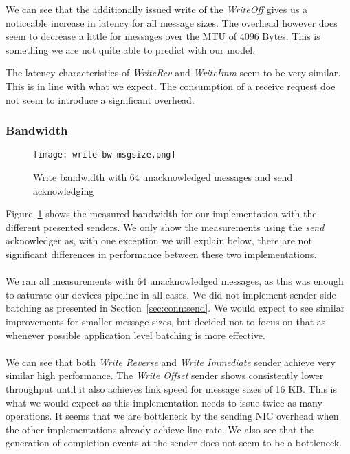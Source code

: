 We can see that the additionally issued write of the \emph{WriteOff} gives us a noticeable increase in latency
for all message sizes. The overhead however does seem to decrease a little for messages over the MTU of $4096$
Bytes. This is something we are not quite able to predict with our model.

The latency characteristics of \emph{WriteRev} and \emph{WriteImm} seem to be very similar. This is in line 
with what we expect. The consumption of a receive request doe not seem to introduce a significant overhead.

\subsubsection{Bandwidth}

\begin{figure}[h]
\texttt{[image: write-bw-msgsize.png]}
\caption{Write bandwidth with 64 unacknowledged messages and send acknowledging}
\label{fig:plot-write-bw}
\end{figure}

Figure~\ref{fig:plot-write-bw} shows the measured bandwidth for our implementation with the different presented
senders. We only show the measurements using the \emph{send} acknowledger as, with one exception we will 
explain below, there are not significant differences in performance between these two implementations.

\paragraph{} We ran all measurements with 64 unacknowledged messages, as this was enough to saturate our 
devices pipeline in all cases. We did not implement sender side batching as presented in 
Section~\ref{sec:conn:send}. We would expect to see similar improvements for smaller message sizes, but 
decided not to focus on that as whenever possible application level batching is more effective.

\paragraph{} We can see that both \emph{Write Reverse} and \emph{Write Immediate} sender achieve very similar
high performance. The \emph{Write Offset} sender shows consistently lower throughput until it also achieves
link speed for message sizes of 16 KB. This is what we would expect as this implementation needs to issue 
twice as many operations. It seems that we are bottleneck by the sending NIC overhead when the other
implementations already achieve line rate. We also see that the generation of completion events at the sender
does not seem to be a bottleneck.

